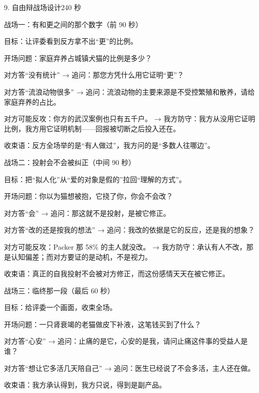 \documentclass[script,pro]{debate}
\begin{document}
\begin{stage}{9. 自由辩战场设计}{240 秒}
\begin{battleground}{战场一：有和更之间的那个数字（前 90 秒）}
\begin{bullets}
\item 目标：让评委看到反方拿不出“更”的比例。
\item 开场问题：家庭弃养占城镇犬猫的比例是多少？
\item 对方答“没有统计” → 追问：那您方凭什么用它证明“更”？
\item 对方答“流浪动物很多” → 追问：流浪动物的主要来源是不受控繁殖和散养，请给家庭弃养的占比。
\item 对方可能反攻：你方的武汉案例也只有五千户。 → 我方防守：我方从没用它证明比例，我方用它证明机制——回报被切断之后投入还在。
\item 收束语：反方全场举的是“有人做过”，我方问的是“多数人往哪边”。
\end{bullets}
\end{battleground}
\begin{battleground}{战场二：投射会不会被纠正（中间 90 秒）}
\begin{bullets}
\item 目标：把“拟人化”从“爱的对象是假的”拉回“理解的方式”。
\item 开场问题：你以为猫想被抱，它挠了你，你会不会改？
\item 对方答“会” → 追问：那这就不是投射，是被它修正。
\item 对方答“改的还是按我的想法” → 追问：我改的依据是它的反应，还是我的想象？
\item 对方可能反攻：Packer 那 58\% 的主人就没改。 → 我方防守：承认有人不改，那是认知偏差；而对方要证的是动机，不是视力。
\item 收束语：真正的自我投射不会被对方修正，而这份感情天天在被它修正。
\end{bullets}
\end{battleground}
\begin{battleground}{战场三：临终那一段（最后 60 秒）}
\begin{bullets}
\item 目标：给评委一个画面，收束全场。
\item 开场问题：一只肾衰竭的老猫做皮下补液，这笔钱买到了什么？
\item 对方答“心安” → 追问：止痛的是它，心安的是我，请问止痛这件事的受益人是谁？
\item 对方答“想让它多活几天陪自己” → 追问：医生已经说了不会多活，主人还在做。
\item 收束语：我方承认得到，我方只说，得到是副产品。

\end{bullets}
\end{battleground}
\end{stage}
\end{document}
